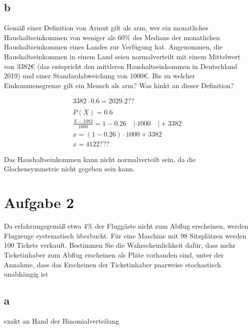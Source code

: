 \subsection{b}

Gemäß einer Definition von Armut gilt als arm, wer ein monatliches
Haushaltseinkommen von weniger als 60\% des Medians der monatlichen
Haushaltseinkommen eines Landes zur Verfügung hat. Angenommen, die
Haushaltseinkommen in einem Land seien normalverteilt mit einem Mittelwert von
$3382$€ (das entspricht den mittleren Haushaltseinkommen in Deutschland 2019)
und einer Standardabweichung von $1000$€. Bis zu welcher Einkommensgrenze gilt
ein Mensch als arm? Was hinkt an dieser Definition?

\begin{align*}
    3382 \cdot 0.6 = 2029.2??                                         \\\\
    P(X) = 0.6                                                        \\
    \frac{X - 3382}{1000} = 1 - 0.26 \quad | \cdot 1000 \quad |+ 3382 \\
    x = (1 - 0.26) \cdot 1000 + 3382                                  \\
    x = 4122???
\end{align*}

Das Haushaltseinkommen kann nicht normalverteilt sein, da die Glockensymmetrie
nicht gegeben sein kann.

\section{Aufgabe 2}

Da erfahrungsgemäß etwa 4\% der Fluggäste nicht zum Abflug er\-schei\-nen,
wer\-den Flugzeuge systematisch überbucht. Für eine Maschine mit 98 Sitzplätzen
werden 100 Tickets verkauft. Bestimmen Sie die Wahrscheinlichkeit dafür, dass
mehr Ticketinhaber zum Abflug erscheinen als Pläte vorhanden sind, unter der
Annahme, dass das Erscheinen der Ticketinhaber paarweise stochastisch
unabhängig ist

\subsection{a}

exakt an Hand der Binomialverteilung

